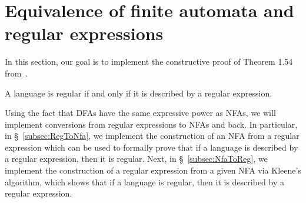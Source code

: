 \section{Equivalence of finite automata and regular expressions}\label{sec:equivalence_regex_fa}

In this section, our goal is to implement the constructive proof of Theorem 1.54 from~\cite{sipser2012}.

\begin{theorem}
    A language is regular if and only if it is described by a regular expression.
\end{theorem}

Using the fact that DFAs have the same expressive power as NFAs, we will implement conversions
from regular expressions to NFAs and back.
In particular, in \S~\ref{subsec:RegToNfa}, we implement the construction of an NFA from a regular expression 
which can be used to formally prove that if a language is described by a regular expression, then it is regular.
Next, in \S~\ref{subsec:NfaToReg}, we implement the construction of a regular expression from a given NFA
via Kleene's algorithm,
which shows that if a language is regular, then it is described by a regular expression.